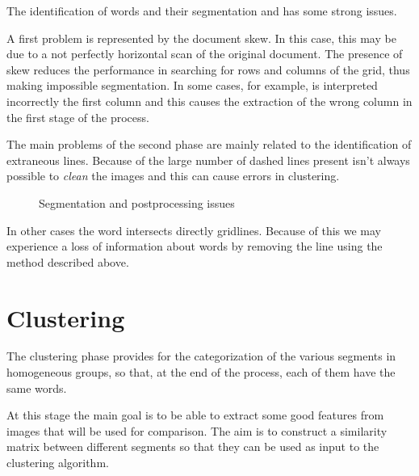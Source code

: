 \documentclass[a4paper,12pt]{article}
\begin{document}
The identification of words and their segmentation and has some strong issues.

A first problem is represented by the document skew. In this case, this may be due to a not perfectly horizontal scan of the original document. The presence of skew reduces the performance in searching for rows and columns of the grid, thus making impossible segmentation. In some cases, for example, is interpreted incorrectly the first column and this causes the extraction of the wrong column in the first stage of the process.

The main problems of the second phase are mainly related to the identification of extraneous lines. Because of the large number of dashed lines present isn't always possible to \emph{clean} the images and this can cause errors in clustering.

\begin{figure}[!ht]
 \centering
 \hspace{5mm}
 \caption{Segmentation and postprocessing issues}
 \end{figure}

In other cases the word intersects directly gridlines. Because of this we may experience a loss of information about words by removing the line using the method described above.


\section{Clustering}

The clustering phase provides for the categorization of the various segments in homogeneous groups, so that, at the end of the process, each of them have the same words.

At this stage the main goal is to be able to extract some good features from images that will be used for comparison. The aim is to construct a similarity matrix between different segments so that they can be used as input to the clustering algorithm.
\end{document}
